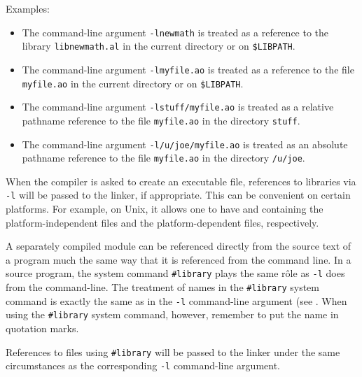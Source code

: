 Examples:
\begin{itemize}

\item The command-line argument {\tt -lnewmath} is treated as a reference
to the library {\tt libnewmath.al} in the current directory or on
{\tt \$LIBPATH}.%
%

\item The command-line argument {\tt -lmyfile.ao} is treated
as a reference to the file {\tt myfile.ao} in the current directory
or on {\tt \$LIBPATH}.

\item The command-line argument {\tt -lstuff/myfile.ao} is treated
as a relative pathname reference to the file {\tt myfile.ao} in
the directory {\tt stuff}.

\item The command-line argument {\tt -l/u/joe/myfile.ao} is treated
as an absolute pathname reference to the file {\tt myfile.ao} in the
directory {\tt /u/joe}.

\end{itemize}

When the \asharp{} compiler is asked to create an executable file,
references to libraries via {\tt -l} will be passed to the linker,
if appropriate.  This can be convenient on certain platforms.
For example, on Unix, it allows one to have  
and  containing the platform-independent 
files and the platform-dependent  files, respectively.


A separately compiled module can be referenced directly from the
source text of a program much the same way that it is referenced
from the command line.
In a source program, the system command {\tt \#library} plays the
same r\^ole as {\tt -l} does from the command-line.
The treatment of names in the {\tt \#library} system command is
exactly the same as in the {\tt -l} command-line argument
(see .
When using the {\tt \#library} system command, however, remember
to put the name in quotation marks.

References to files using {\tt \#library} will be passed to the linker
under the same circumstances as the corresponding {\tt -l} command-line
argument.


